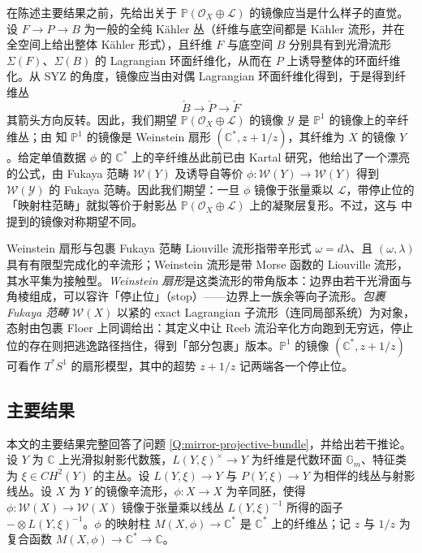在陈述主要结果之前，先给出关于 $\mathbb{P} (\mathcal{O}_X\oplus\mathcal{L})$ 的镜像应当是什么样子的直觉。设 $F\to P\to B$ 为一般的全纯 Kähler 丛（纤维与底空间都是 Kähler 流形，并在全空间上给出整体 Kähler 形式），且纤维 $F$ 与底空间 $B$ 分别具有到光滑流形 $\Sigma (F)$、$\Sigma (B)$ 的 Lagrangian 环面纤维化，从而在 $P$ 上诱导整体的环面纤维化。从 SYZ 的角度，镜像应当由对偶 Lagrangian 环面纤维化得到，于是得到纤维丛
\[
    \check{B}\to\check{P}\to\check{F}
\]
其箭头方向反转。因此，我们期望 $\mathbb{P} (\mathcal{O}_X\oplus\mathcal{L})$ 的镜像 $\mathcal{Y}$ 是 $\mathbb{P}^1$ 的镜像上的辛纤维丛；由 \cite{FLTZ12} 知 $\mathbb{P}^1$ 的镜像是 Weinstein 扇形 $(\mathbb{C}^{\ast}, z+1/z)$，其纤维为 $X$ 的镜像 $Y$。给定单值数据 $\phi$ 的 $\mathbb{C}^{\ast}$ 上的辛纤维丛此前已由 Kartal \cite{Kartal21} 研究，他给出了一个漂亮的公式，由 Fukaya 范畴 $\mathcal{W} (Y)$ 及诱导自等价 $\phi\colon\mathcal{W} (Y)\to\mathcal{W} (Y)$ 得到 $\mathcal{W} (\mathcal{Y})$ 的 Fukaya 范畴。因此我们期望：一旦 $\phi$ 镜像于张量乘以 $\mathcal{L}$，带停止位的「映射柱范畴」就拟等价于射影丛 $\mathbb{P}\left(\mathcal{O}_X\oplus\mathcal{L}\right)$ 上的凝聚层复形。不过，这与 \cite{Kartal21} 中提到的镜像对称期望不同。

\begin{conceptbox}{Weinstein 扇形与包裹 Fukaya 范畴}
Liouville 流形指带辛形式 $\omega=d\lambda$、且 $(\omega,\lambda)$ 具有有限型完成化的辛流形；Weinstein 流形是带 Morse 函数的 Liouville 流形，其水平集为接触型。\emph{Weinstein 扇形}是这类流形的带角版本：边界由若干光滑面与角棱组成，可以容许「停止位」（stop）——边界上一族余等向子流形。\emph{包裹 Fukaya 范畴} $\mathcal{W}(X)$ 以紧的 exact Lagrangian 子流形（连同局部系统）为对象，态射由包裹 Floer 上同调给出：其定义中让 Reeb 流沿辛化方向跑到无穷远，停止位的存在则把逃逸路径挡住，得到「部分包裹」版本。$\mathbb{P}^1$ 的镜像 $(\mathbb{C}^{\ast},z+1/z)$ 可看作 $T^{\ast}S^1$ 的扇形模型，其中的超势 $z+1/z$ 记两端各一个停止位。
\par\smallskip{}
\end{conceptbox}

\subsection{主要结果}
本文的主要结果完整回答了问题 \ref{Q:mirror-projective-bundle}，并给出若干推论。设 $Y$ 为 $\mathbb{C}$ 上光滑拟射影代数簇，$L(Y,\xi)^{\times}\to Y$ 为纤维是代数环面 $\mathbb{G}_m$、特征类为 $\xi\in CH^2 (Y)$ 的主丛。设 $L(Y,\xi)\to Y$ 与 $P(Y,\xi)\to Y$ 为相伴的线丛与射影线丛。设 $X$ 为 $Y$ 的镜像辛流形，$\phi\colon X\to X$ 为辛同胚，使得 $\phi\colon\mathcal{W} (X)\to\mathcal{W} (X)$ 镜像于张量乘以线丛 $L(Y,\xi)^{-1}$ 所得的函子 $-\otimes L(Y,\xi)^{-1}$。$\phi$ 的映射柱 $M(X,\phi)\to\mathbb{C}^{\ast}$ 是 $\mathbb{C}^{\ast}$ 上的纤维丛；记 $z$ 与 $1/z$ 为复合函数 $M(X,\phi)\to\mathbb{C}^{\ast}\to\mathbb{C}$。


